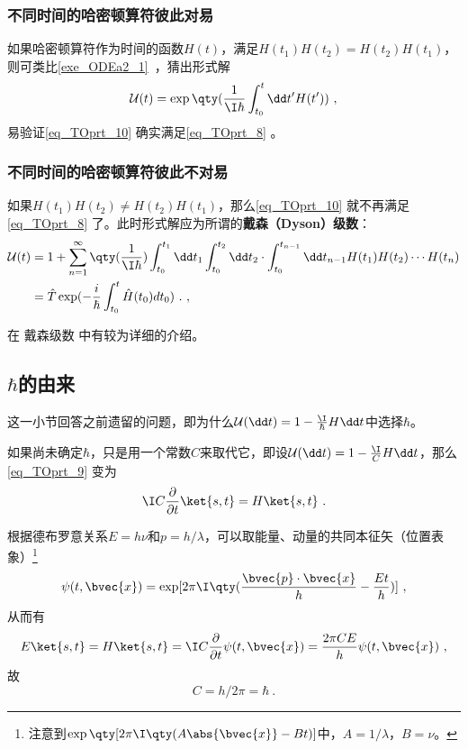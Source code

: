 \subsubsection{不同时间的哈密顿算符彼此对易}

如果哈密顿算符作为时间的函数$H(t)$，满足$H(t_1)H(t_2)=H(t_2)H(t_1)$，则可类比\autoref{exe_ODEa2_1}~，猜出形式解
\begin{equation}\label{eq_TOprt_10}
\mathcal{U}(t)=\exp\qty(\frac{1}{\I\hbar}\int^t_{t_0}\dd t' H(t'))~,
\end{equation}
易验证\autoref{eq_TOprt_10} 确实满足\autoref{eq_TOprt_8} 。



\subsubsection{不同时间的哈密顿算符彼此不对易}

如果$H(t_1)H(t_2)\not=H(t_2)H(t_1)$，那么\autoref{eq_TOprt_10} 就不再满足\autoref{eq_TOprt_8} 了。此时形式解应为所谓的\textbf{戴森（Dyson）级数}：
\begin{align}
\mathcal{U}(t) &= 1+\sum_{n=1}^\infty \qty(\frac{1}{\I \hbar})\int^{t_1}_{t_0}\dd t_1\int^{t_2}_{t_0}\dd t_2\cdot \int^{t_{n-1}}_{t_0}\dd t_{n-1}H(t_1)H(t_2)\cdots H(t_n) \\
&=\hat T \exp(-\frac{i}{\hbar}\int^t_{t_0}\hat H(t_0)dt_0)~.~,
\end{align}

在 戴森级数 中有较为详细的介绍。


\subsection{$\hbar$的由来}\label{sub_TOprt_1}

这一小节回答之前遗留的问题，即为什么$\mathcal{U}(\dd t) = 1-\frac{\I}{\hbar} H \dd t$中选择$\hbar$。

如果尚未确定$\hbar$，只是用一个常数$C$来取代它，即设$\mathcal{U}(\dd t) = 1-\frac{\I}{C} H \dd t$，那么\autoref{eq_TOprt_9} 变为
\begin{equation}
\I C\frac{\partial}{\partial t}\ket{s, t}=H\ket{s, t}~.
\end{equation}

根据德布罗意关系$E=h\nu$和$p=h/\lambda$，可以取能量、动量的共同本征矢（位置表象）\footnote{注意到$\exp\qty[2\pi \I \qty(A\abs{\bvec{x}}-Bt)]$中，$A=1/\lambda$，$B=\nu$。}
\begin{equation}
\psi(t, \bvec{x})=\exp[2\pi\I\qty(\frac{\bvec{p}\cdot\bvec{x}}{h}-\frac{Et}{h})]~,
\end{equation}
从而有
\begin{equation}
E\ket{s, t}=H\ket{s, t}=\I C\frac{\partial}{\partial t}\psi(t, \bvec{x}) = \frac{2\pi C E}{h} \psi(t, \bvec{x})~,
\end{equation}
故
\begin{equation}
C=h/2\pi=\hbar~.
\end{equation}








